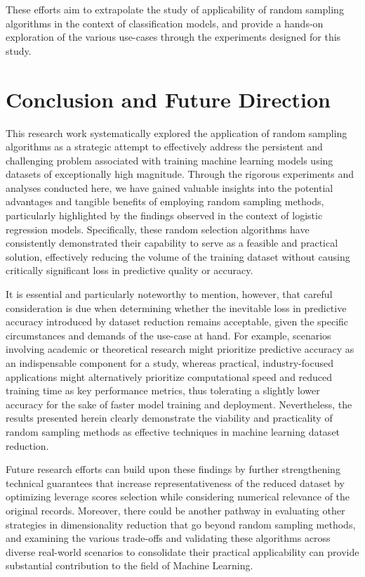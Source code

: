 \documentclass{article}
\theoremstyle{plain}
\theoremstyle{definition}
\theoremstyle{remark}
\begin{document}
These efforts aim to extrapolate the study of applicability of random sampling algorithms in the context of classification models, and provide a hands-on exploration of the various use-cases through the experiments designed for this study.


\section{Conclusion and Future Direction}

This research work systematically explored the application of random sampling algorithms as a strategic attempt to effectively address the persistent and challenging problem associated with training machine learning models using datasets of exceptionally high magnitude. Through the rigorous experiments and analyses conducted here, we have gained valuable insights into the potential advantages and tangible benefits of employing random sampling methods, particularly highlighted by the findings observed in the context of logistic regression models. Specifically, these random selection algorithms have consistently demonstrated their capability to serve as a feasible and practical solution, effectively reducing the volume of the training dataset without causing critically significant loss in predictive quality or accuracy. 

It is essential and particularly noteworthy to mention, however, that careful consideration is due when determining whether the inevitable loss in predictive accuracy introduced by dataset reduction remains acceptable, given the specific circumstances and demands of the use-case at hand. For example, scenarios involving academic or theoretical research might prioritize predictive accuracy as an indispensable component for a study, whereas practical, industry-focused applications might alternatively prioritize computational speed and reduced training time as key performance metrics, thus tolerating a slightly lower accuracy for the sake of faster model training and deployment. Nevertheless, the results presented herein clearly demonstrate the viability and practicality of random sampling methods as effective techniques in machine learning dataset reduction. 

Future research efforts can build upon these findings by further strengthening technical guarantees that increase representativeness of the reduced dataset by optimizing leverage scores selection while considering numerical relevance of the original records. Moreover, there could be another pathway in evaluating other strategies in dimensionality reduction that go beyond random sampling methods, and examining the various trade-offs and validating these algorithms across diverse real-world scenarios to consolidate their practical applicability can provide substantial contribution to the field of Machine Learning.
\end{document}
